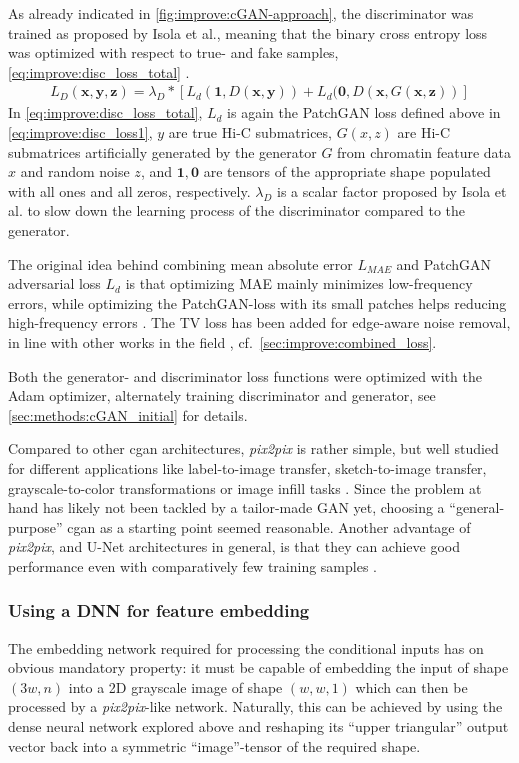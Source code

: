 As already indicated in \cref{fig:improve:cGAN-approach}, the discriminator was trained as proposed by Isola et al.,
meaning that the binary cross entropy loss was optimized with respect to true- and fake samples, \cref{eq:improve:disc_loss_total} .
\begin{align}
 L_D(\mathbf{x,y,z}) = \lambda_D * \left[ L_d(\mathbf{1}, D(\mathbf{x,y})) + L_d(\mathbf{0}, D(\mathbf{x},G(\mathbf{x, z})) \right] \label{eq:improve:disc_loss_total}
\end{align}
In \cref{eq:improve:disc_loss_total}, $L_d$ is again the PatchGAN loss defined above in \cref{eq:improve:disc_loss1}, $y$ are true Hi-C submatrices, 
$G(x,z)$ are Hi-C submatrices artificially generated by the generator $G$
from chromatin feature data $x$ and random noise $z$, and $\mathbf{1}, \mathbf{0}$ are tensors of the appropriate shape populated with all ones and all zeros, respectively.
$\lambda_D$ is a scalar factor proposed by Isola et al. to slow down the learning process of the discriminator compared to the generator.

The original idea behind combining mean absolute error $L_\mathit{MAE}$ and PatchGAN adversarial loss $L_d$ is that optimizing MAE 
mainly minimizes low-frequency errors, while optimizing the PatchGAN-loss with its small patches helps reducing high-frequency errors \cite{Isola2017}.
The TV loss has been added for edge-aware noise removal, in line with other works in the field \cite{Hong2020}, cf.~\cref{sec:improve:combined_loss}.

Both the generator- and discriminator loss functions were optimized with the Adam optimizer,
alternately training discriminator and generator, see \cref{sec:methods:cGAN_initial} for details.

Compared to other \acrshort{cgan} architectures, \emph{pix2pix} is rather simple, but well studied for different applications like label-to-image transfer,
sketch-to-image transfer, grayscale-to-color transformations or image infill tasks \cite{Isola2017}.
Since the problem at hand has likely not been tackled by a tailor-made GAN yet, 
choosing a ``general-purpose'' \acrshort{cgan} as a starting point seemed reasonable.
Another advantage of \emph{pix2pix}, and U-Net architectures in general, 
is that they can achieve good performance even with comparatively few training samples \cite{Isola2017, Ronneberger2015}.

\subsubsection{Using a DNN for feature embedding} \label{sec:improve:DNN_embedding}
The embedding network required for processing the conditional inputs
has on obvious mandatory property: it must be capable of embedding the input of shape $(3w,n)$ 
into a 2D grayscale image of shape $(w,w,1)$ which can then be processed by a \emph{pix2pix}-like network.
Naturally, this can be achieved by using the dense neural network explored above
and reshaping its ``upper triangular'' output vector back into a symmetric ``image''-tensor of the required shape.

